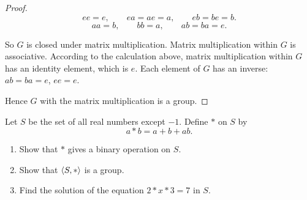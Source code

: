 \begin{proof}
    \[
        ee = e,\qquad ea = ae = a,\qquad eb = be = b.
    \]
    \[
        aa = b,\qquad bb = a,\qquad ab = ba = e.
    \]

    So $G$ is closed under matrix multiplication. Matrix multiplication within $G$ is associative. According to the calculation above, matrix multiplication within $G$ has an identity element, which is $e$. Each element of $G$ has an inverse: $ab = ba = e$, $ee = e$.

    Hence $G$ with the matrix multiplication is a group.
\end{proof}

\begin{exercise}
    Let $S$ be the set of all real numbers except $-1$. Define $*$ on $S$ by
    \[
        a * b = a + b + ab.
    \]
    \begin{enumerate}[label={\textbf{\alph*.}}]
        \item Show that $*$ gives a binary operation on $S$.
        \item Show that $\left\langle{S, *}\right\rangle$ is a group.
        \item Find the solution of the equation $2 * x * 3 = 7$ in $S$.
    \end{enumerate}
\end{exercise}

